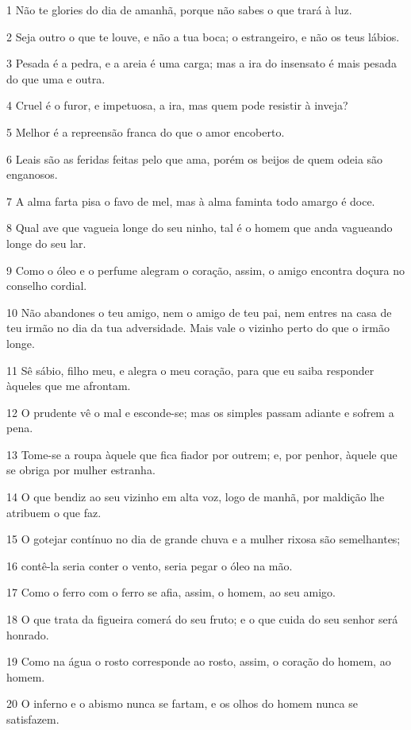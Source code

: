 \par 1 Não te glories do dia de amanhã, porque não sabes o que trará à luz.
\par 2 Seja outro o que te louve, e não a tua boca; o estrangeiro, e não os teus lábios.
\par 3 Pesada é a pedra, e a areia é uma carga; mas a ira do insensato é mais pesada do que uma e outra.
\par 4 Cruel é o furor, e impetuosa, a ira, mas quem pode resistir à inveja?
\par 5 Melhor é a repreensão franca do que o amor encoberto.
\par 6 Leais são as feridas feitas pelo que ama, porém os beijos de quem odeia são enganosos.
\par 7 A alma farta pisa o favo de mel, mas à alma faminta todo amargo é doce.
\par 8 Qual ave que vagueia longe do seu ninho, tal é o homem que anda vagueando longe do seu lar.
\par 9 Como o óleo e o perfume alegram o coração, assim, o amigo encontra doçura no conselho cordial.
\par 10 Não abandones o teu amigo, nem o amigo de teu pai, nem entres na casa de teu irmão no dia da tua adversidade. Mais vale o vizinho perto do que o irmão longe.
\par 11 Sê sábio, filho meu, e alegra o meu coração, para que eu saiba responder àqueles que me afrontam.
\par 12 O prudente vê o mal e esconde-se; mas os simples passam adiante e sofrem a pena.
\par 13 Tome-se a roupa àquele que fica fiador por outrem; e, por penhor, àquele que se obriga por mulher estranha.
\par 14 O que bendiz ao seu vizinho em alta voz, logo de manhã, por maldição lhe atribuem o que faz.
\par 15 O gotejar contínuo no dia de grande chuva e a mulher rixosa são semelhantes;
\par 16 contê-la seria conter o vento, seria pegar o óleo na mão.
\par 17 Como o ferro com o ferro se afia, assim, o homem, ao seu amigo.
\par 18 O que trata da figueira comerá do seu fruto; e o que cuida do seu senhor será honrado.
\par 19 Como na água o rosto corresponde ao rosto, assim, o coração do homem, ao homem.
\par 20 O inferno e o abismo nunca se fartam, e os olhos do homem nunca se satisfazem.
